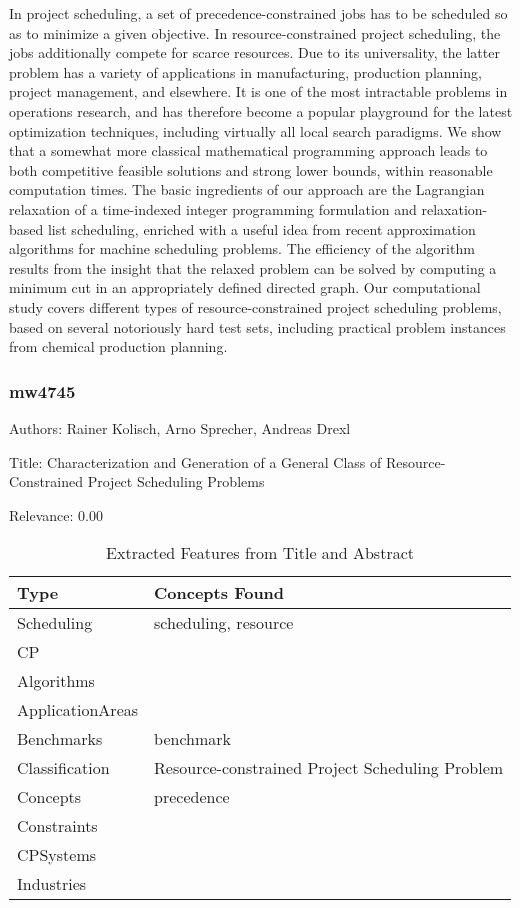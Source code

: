   In project scheduling, a set of precedence-constrained jobs has to be scheduled so as to minimize a given objective. In resource-constrained project scheduling, the jobs additionally compete for scarce resources. Due to its universality, the latter problem has a variety of applications in manufacturing, production planning, project management, and elsewhere. It is one of the most intractable problems in operations research, and has therefore become a popular playground for the latest optimization techniques, including virtually all local search paradigms. We show that a somewhat more classical mathematical programming approach leads to both competitive feasible solutions and strong lower bounds, within reasonable computation times. The basic ingredients of our approach are the Lagrangian relaxation of a time-indexed integer programming formulation and relaxation-based list scheduling, enriched with a useful idea from recent approximation algorithms for machine scheduling problems. The efficiency of the algorithm results from the insight that the relaxed problem can be solved by computing a minimum cut in an appropriately defined directed graph. Our computational study covers different types of resource-constrained project scheduling problems, based on several notoriously hard test sets, including practical problem instances from chemical production planning.  

\subsubsection{mw4745}
\label{mw:mw4745}

Authors: Rainer Kolisch, Arno Sprecher, Andreas Drexl

Title: Characterization and Generation of a General Class of Resource-Constrained Project Scheduling Problems

Relevance:  0.00

{\scriptsize
\begin{longtable}{p{2cm}p{20cm}}
\caption{Extracted Features from Title and Abstract}\\ \toprule
Type & Concepts Found\\ \midrule
\endhead
\bottomrule
\endfoot
Scheduling & scheduling, resource\\ 
CP & \\ 
Algorithms & \\ 
ApplicationAreas & \\ 
Benchmarks & benchmark\\ 
Classification & Resource-constrained Project Scheduling Problem\\ 
Concepts & precedence\\ 
Constraints & \\ 
CPSystems & \\ 
Industries & \\ 
\end{longtable}
}

